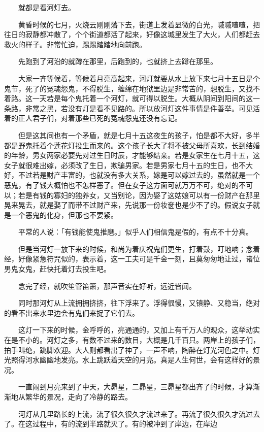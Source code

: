\documentclass[UTF8]{ctexart}
\begin{document}
　　就都是看河灯去。

　　黄昏时候的七月，火烧云刚刚落下去，街道上发着显微的白光，嘁嘁喳喳，把往日的寂静都冲散了，个个街道都活了起来，好像这城里发生了大火，人们都赶去救火的样子。非常忙迫，踢踢踏踏地向前跑。

　　先跑到了河沿的就蹲在那里，后跑到的，也就挤上去蹲在那里。

　　大家一齐等候着，等候着月亮高起来，河灯就要从水上放下来七月十五日是个鬼节，死了的冤魂怨鬼，不得脱生，缠绵在地狱里边是非常苦的，想脱生，又找不着路。这一天若是每个鬼托着一个河灯，就可得以脱生。大概从阴间到阳间的这一条路，非常之黑，若没有灯是看不见路的。所以放河灯这件事情是件善举。可见活着的正人君子们，对着那些已死的冤魂怨鬼还没有忘记。

　　但是这其间也有一个矛盾，就是七月十五这夜生的孩子，怕是都不大好，多半都是野鬼托着个莲花灯投生而来的。这个孩子长大了将不被父母所喜欢，长到结婚的年龄，男女两家必要先对过生日时辰，才能够结亲。若是女家生在七月十五，这女子就很难出嫁，必须改了生日，欺骗男家。若是男家七月十五的生日，也不大好，不过若是财产丰富的，也就没有多大关系，嫁是可以嫁过去的，虽然就是一个恶鬼，有了钱大概怕也不怎样恶了。但在女子这方面可就万万不可，绝对的不可以；若是有钱的寡妇的独养女，又当别论，因为娶了这姑娘可以有一份财产在那里晃来晃去，就是娶了而带不过财产来，先说那一份妆奁也是少不了的。假说女子就是一个恶鬼的化身，但那也不要紧。

　　平常的人说：「有钱能使鬼推磨。」似乎人们相信鬼是假的，有点不十分真。

　　但是当河灯一放下来的时候，和尚为着庆祝鬼们更生，打着鼓，叮地响；念着经，好像紧急符咒似的，表示着，这一工夫可是千金一刻，且莫匆匆地让过，诸位男鬼女鬼，赶快托着灯去投生吧。

　　念完了经，就吹笙管笛箫，那声音实在好听，远近皆闻。

　　同时那河灯从上流拥拥挤挤，往下浮来了。浮得很慢，又镇静、又稳当，绝对的看不出来水里边会有鬼们来捉了它们去。

　　这灯一下来的时候，金呼呼的，亮通通的，又加上有千万人的观众，这举动实在是不小的。河灯之多，有数不过来的数目，大概是几千百只。两岸上的孩子们，拍手叫绝，跳脚欢迎。大人则都看出了神了，一声不响，陶醉在灯光河色之中。灯光照得河水幽幽地发亮。水上跳跃着天空的月亮。真是人生何世，会有这样好的景况。

　　一直闹到月亮来到了中天，大昴星，二昴星，三昴星都出齐了的时候，才算渐渐地从繁华的景况，走向了冷静的路去。

　　河灯从几里路长的上流，流了很久很久才流过来了。再流了很久很久才流过去了。在这过程中，有的流到半路就灭了。有的被冲到了岸边，在岸边
\end{document}

